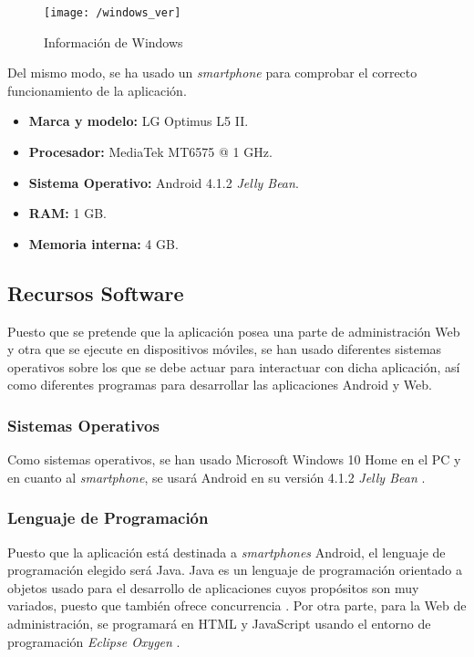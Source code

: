 \begin{figure}[!h]
	\begin{center}
		\texttt{[image: /windows\_ver]}
		\caption{Información de Windows}
		\label{fig:winver}
	\end{center}
\end{figure}

Del mismo modo, se ha usado un \textit{smartphone} para comprobar el correcto funcionamiento de la aplicación.

\begin{itemize}
	\item \textbf{Marca y modelo:} LG Optimus L5 II.
	\item \textbf{Procesador:} MediaTek MT6575 @ 1 \acs{GHz}.
	\item \textbf{Sistema Operativo:} Android 4.1.2 \textit{Jelly Bean}.
	\item \textbf{RAM:} 1 \acs{GB}.
	\item \textbf{Memoria interna:} 4 \acs{GB}.
\end{itemize}

\subsection{Recursos Software}
Puesto que se pretende que la aplicación posea una parte de administración Web y otra que se ejecute en dispositivos móviles, se han usado diferentes sistemas operativos sobre los que se debe actuar para interactuar con dicha aplicación, así como diferentes programas para desarrollar las aplicaciones Android y Web.

\clearpage

\subsubsection*{Sistemas Operativos}
Como sistemas operativos, se han usado Microsoft Windows 10 Home \cite{Microsoft} en el PC y en cuanto al \textit{smartphone}, se usará Android en su versión 4.1.2 \textit{Jelly Bean} \cite{Andro}.

\subsubsection*{Lenguaje de Programación}
Puesto que la aplicación está destinada a \textit{smartphones} Android, el lenguaje de programación elegido será Java. Java es un lenguaje de programación orientado a objetos usado para el desarrollo de aplicaciones cuyos propósitos son muy variados, puesto que también ofrece concurrencia \cite{Java}. Por otra parte, para la Web de administración, se programará en HTML y JavaScript usando el entorno de programación \textit{Eclipse Oxygen} \cite{EclipseFoundation2018} .

